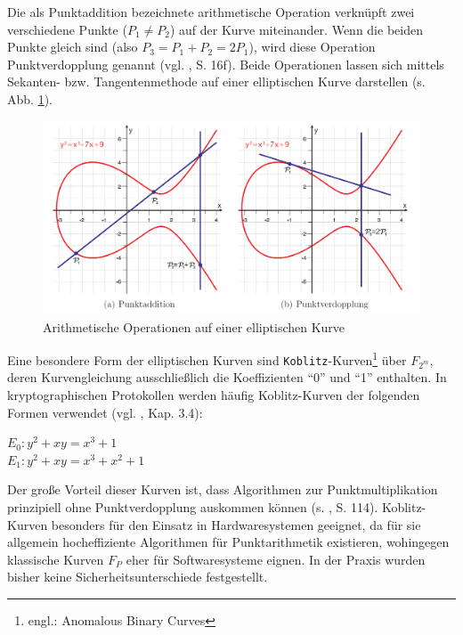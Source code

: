Die als Punktaddition bezeichnete arithmetische Operation verknüpft zwei verschiedene Punkte ($P_1 \ne P_2$) auf der Kurve miteinander. Wenn die beiden Punkte gleich sind (also $P_3 = P_1 + P_2 = 2 P_1$), wird diese Operation Punktverdopplung genannt (vgl. \cite{puttmann}, S. 16f). Beide Operationen lassen sich mittels Sekanten- bzw. Tangentenmethode auf einer elliptischen Kurve darstellen (s. Abb. \ref{fig:padd}). 

\begin{figure}[H]
	\centering
   \includegraphics[width=\textwidth]{bilder/p-addition}
	\caption{Arithmetische Operationen auf einer elliptischen Kurve}
	\label{fig:padd}
\end{figure}

Eine besondere Form der elliptischen Kurven sind \texttt{Koblitz}-Kurven\footnote{engl.: Anomalous Binary Curves} über $F_{2^m}$, deren Kurvengleichung ausschließlich die Koeffizienten ``0'' und ``1'' enthalten. In kryptographischen Protokollen werden häufig Koblitz-Kurven der folgenden Formen verwendet (vgl. \cite{guide}, Kap. 3.4): \\
\begin{center}
$E_0 : y^2 + x y = x^3 + 1 $ \\
$E_1 : y^2 + x y = x^3 + x^2 + 1 $
\end{center}

Der große Vorteil dieser Kurven ist, dass Algorithmen zur Punktmultiplikation prinzipiell ohne Punktverdopplung auskommen können (s. \cite{guide}, S. 114).
Koblitz-Kurven besonders für den Einsatz in Hardwaresystemen geeignet, da für sie allgemein hocheffiziente Algorithmen für Punktarithmetik existieren, wohingegen klassische Kurven $F_P$ eher für Softwaresysteme eignen. In der Praxis wurden bisher keine Sicherheitsunterschiede festgestellt. \\


